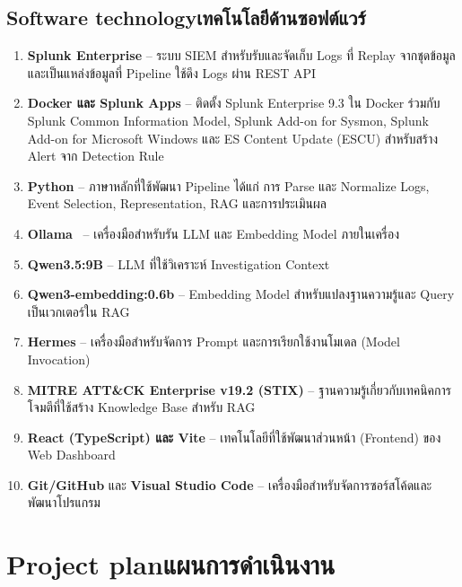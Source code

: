 \subsection{\ifenglish Software technology\else เทคโนโลยีด้านซอฟต์แวร์\fi}
\begin{enumerate}
    \item \textbf{Splunk Enterprise} -- ระบบ SIEM สำหรับรับและจัดเก็บ
          Logs ที่ Replay จากชุดข้อมูล และเป็นแหล่งข้อมูลที่ Pipeline
          ใช้ดึง Logs ผ่าน REST API

    \item \textbf{Docker และ Splunk Apps} -- ติดตั้ง Splunk Enterprise 9.3 ใน Docker
          ร่วมกับ Splunk Common Information Model, Splunk Add-on for Sysmon,
          Splunk Add-on for Microsoft Windows และ ES Content Update (ESCU)
          สำหรับสร้าง Alert จาก Detection Rule

    \item \textbf{Python} -- ภาษาหลักที่ใช้พัฒนา Pipeline
          ได้แก่ การ Parse และ Normalize Logs, Event Selection,
          Representation, RAG และการประเมินผล

    \item \textbf{Ollama}~\cite{ollama} -- เครื่องมือสำหรับรัน
          LLM และ Embedding Model ภายในเครื่อง

    \item \textbf{Qwen3.5:9B} -- LLM ที่ใช้วิเคราะห์ Investigation Context

    \item \textbf{Qwen3-embedding:0.6b} -- Embedding Model สำหรับแปลงฐานความรู้และ Query เป็นเวกเตอร์ใน RAG

    \item \textbf{Hermes} -- เครื่องมือสำหรับจัดการ Prompt
          และการเรียกใช้งานโมเดล (Model Invocation)

    \item \textbf{MITRE ATT\&CK Enterprise v19.2 (STIX)}
          -- ฐานความรู้เกี่ยวกับเทคนิคการโจมตีที่ใช้สร้าง
          Knowledge Base สำหรับ RAG

    \item \textbf{React (TypeScript) และ Vite} -- เทคโนโลยีที่ใช้พัฒนาส่วนหน้า (Frontend) ของ Web Dashboard

    \item \textbf{Git/GitHub} และ \textbf{Visual Studio Code}
          -- เครื่องมือสำหรับจัดการซอร์สโค้ดและพัฒนาโปรแกรม
\end{enumerate}

\section{\ifenglish Project plan\else แผนการดำเนินงาน\fi}

